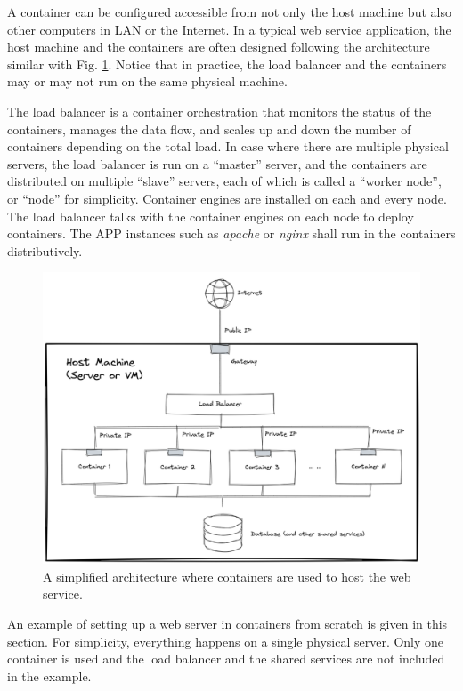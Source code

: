 A container can be configured accessible from not only the host machine but also other computers in LAN or the Internet. In a typical web service application, the host machine and the containers are often designed following the architecture similar with Fig. \ref{ch:vac:fig:containerwebserverarchitecture}. Notice that in practice, the load balancer and the containers may or may not run on the same physical machine.

The load balancer is a container orchestration that monitors the status of the containers, manages the data flow, and scales up and down the number of containers depending on the total load. In case where there are multiple physical servers, the load balancer is run on a ``master'' server, and the containers are distributed on multiple ``slave'' servers, each of which is called a ``worker node'', or ``node'' for simplicity. Container engines are installed on each and every node. The load balancer talks with the container engines on each node to deploy containers. The APP instances such as \textit{apache} or \textit{nginx} shall run in the containers distributively.
\begin{figure}
	\centering
	\includegraphics[width=350pt]{chapters/ch-virtualization-and-containerization/figures/containerwebserverarchitecture.png}
	\caption{A simplified architecture where containers are used to host the web service.} \label{ch:vac:fig:containerwebserverarchitecture}
\end{figure}

An example of setting up a web server in containers from scratch is given in this section. For simplicity, everything happens on a single physical server. Only one container is used and the load balancer and the shared services are not included in the example.


